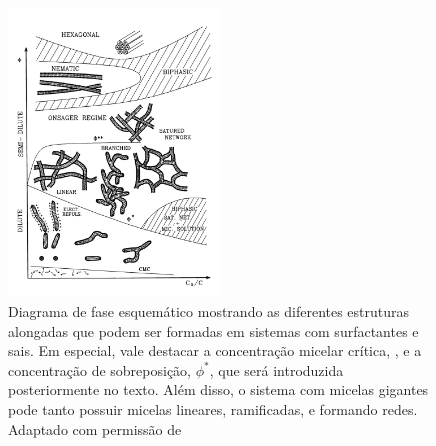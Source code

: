 		\begin{figure}[h]
			\centering
			\includegraphics[width=0.5\textwidth]{imagens/artigos/estruturas_regimes_concentracoes_cates_fielding}
			\caption{Diagrama de fase esquemático mostrando as diferentes estruturas alongadas que podem ser formadas em sistemas com surfactantes e sais. Em especial, vale destacar a concentração micelar crítica, \cmc, e a concentração de sobreposição, \(\phi^*\), que será introduzida posteriormente no texto. Além disso, o sistema com micelas gigantes pode tanto possuir micelas lineares, ramificadas, e formando redes. Adaptado com permissão de \citeauthor{Herb1994}}
			\label{fig:regimes_e_estruturas_lequeux}
		\end{figure}
		
